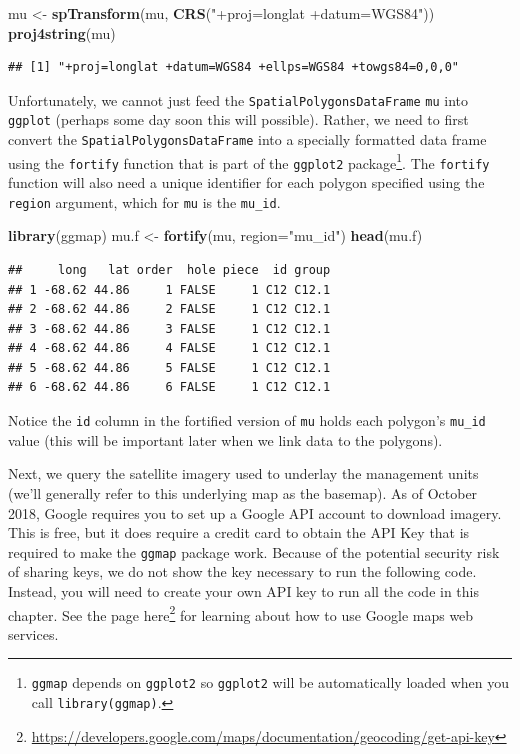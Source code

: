 \documentclass[
]{krantz}
\newenvironment{Shaded}{\begin{snugshade}}{\end{snugshade}}
\newcommand{\DataTypeTok}[1]{\textcolor[rgb]{0.13,0.29,0.53}{#1}}
\newcommand{\KeywordTok}[1]{\textcolor[rgb]{0.13,0.29,0.53}{\textbf{#1}}}
\newcommand{\NormalTok}[1]{#1}
\newcommand{\StringTok}[1]{\textcolor[rgb]{0.31,0.60,0.02}{#1}}
\renewcommand{\href}[2]{#2\footnote{\url{#1}}}
\begin{document}
\begin{Shaded}
\begin{Highlighting}[]
\NormalTok{mu \textless{}{-}}\StringTok{ }\KeywordTok{spTransform}\NormalTok{(mu, }\KeywordTok{CRS}\NormalTok{(}\StringTok{"+proj=longlat +datum=WGS84"}\NormalTok{))}
\KeywordTok{proj4string}\NormalTok{(mu)}
\end{Highlighting}
\end{Shaded}

\begin{verbatim}
## [1] "+proj=longlat +datum=WGS84 +ellps=WGS84 +towgs84=0,0,0"
\end{verbatim}

Unfortunately, we cannot just feed the \texttt{SpatialPolygonsDataFrame} \texttt{mu} into \texttt{ggplot} (perhaps some day soon this will possible). Rather, we need to first convert the \texttt{SpatialPolygonsDataFrame} into a specially formatted data frame using the \texttt{fortify} function that is part of the \texttt{ggplot2} package\footnote{\texttt{ggmap} depends on \texttt{ggplot2} so \texttt{ggplot2} will be automatically loaded when you call \texttt{library(ggmap)}.}. The \texttt{fortify} function will also need a unique identifier for each polygon specified using the \texttt{region} argument, which for \texttt{mu} is the \texttt{mu\_id}.

\begin{Shaded}
\begin{Highlighting}[]
\KeywordTok{library}\NormalTok{(ggmap)}
\NormalTok{mu.f \textless{}{-}}\StringTok{ }\KeywordTok{fortify}\NormalTok{(mu, }\DataTypeTok{region=}\StringTok{"mu\_id"}\NormalTok{)}
\KeywordTok{head}\NormalTok{(mu.f)}
\end{Highlighting}
\end{Shaded}

\begin{verbatim}
##     long   lat order  hole piece  id group
## 1 -68.62 44.86     1 FALSE     1 C12 C12.1
## 2 -68.62 44.86     2 FALSE     1 C12 C12.1
## 3 -68.62 44.86     3 FALSE     1 C12 C12.1
## 4 -68.62 44.86     4 FALSE     1 C12 C12.1
## 5 -68.62 44.86     5 FALSE     1 C12 C12.1
## 6 -68.62 44.86     6 FALSE     1 C12 C12.1
\end{verbatim}

Notice the \texttt{id} column in the fortified version of \texttt{mu} holds each polygon's \texttt{mu\_id} value (this will be important later when we link data to the polygons).

Next, we query the satellite imagery used to underlay the management units (we'll generally refer to this underlying map as the basemap). As of October 2018, Google requires you to set up a Google API account to download imagery. This is free, but it does require a credit card to obtain the API Key that is required to make the \texttt{ggmap} package work. Because of the potential security risk of sharing keys, we do not show the key necessary to run the following code. Instead, you will need to create your own API key to run all the code in this chapter. See the page \href{https://developers.google.com/maps/documentation/geocoding/get-api-key}{here} for learning about how to use Google maps web services.
\end{document}
